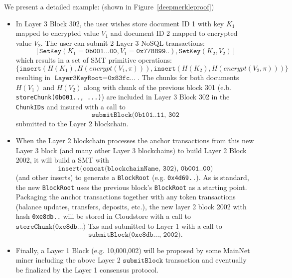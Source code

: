 \documentclass{article}
\newcommand{\databaseencryptionkey}{\pi}
\newcommand{\hash}[1]{H(#1)}
\newcommand{\encrypt}[1]{encrypt(#1, \databaseencryptionkey)}
\begin{document}
We present a detailed example: (shown in Figure~\ref{deepmerkleproof})
\begin{itemize}
\item In Layer 3 Block 302, the user wishes store document ID 1 with key $K_1$ mapped to encrypted value $V_1$ and document ID 2 mapped to encrypted value $V_2$. The user can submit 2 Layer 3 NoSQL transactions: 
\begin{equation*}
\left[ \texttt{SetKey}(K_1=\texttt{0b001...00},V_1=\texttt{0x778899..}), 
\texttt{SetKey}(K_2, V_2)
\right]
\end{equation*}
\noindent which results in a set of SMT primitive operations: 
\begin{equation*}
\{\texttt{insert}(\hash{K_1},\hash{\encrypt{V_1}}),  \texttt{insert}(\hash{K_2},\hash{\encrypt{V_2}}) \}
\end{equation*}
resulting in 
$\texttt{Layer3KeyRoot}=\texttt{0x83fc...}$.  The chunks for both documents $H(V_1)$ and $H(V_2)$ along with chunk of the previous block 301  (e.b. \texttt{storeChunk(0b001.., ...)}) are included in Layer 3 Block 302 in the \texttt{ChunkIDs} and insured with a call to \[
\texttt{submitBlock(0b101..11, 302}
\]
submitted to the Layer 2 blockchain. 

\item When the Layer 2 blockchain processes the anchor transactions from this new Layer 3 block (and many other Layer 3 blockchains) to build Layer 2 Block 2002, it will build a SMT with 
\[
\texttt{insert(concat(blockchainName, 302), 0b001..00)}
\]
(and other inserts) to generate a \texttt{BlockRoot} (e.g. \texttt{0x4d69..}).  As is standard, the new \texttt{BlockRoot} uses the previous block's \texttt{BlockRoot} as a starting point.  Packaging the anchor transactions together with any token transactions (balance updates, transfers, deposits, etc.), the new layer 2 block 2002 with hash \texttt{0xe8db..} will be stored in Cloudstore with a call to $\texttt{storeChunk(0xe8db...)}$ 
Txs and submitted to Layer 1 with a call to 
\[
\texttt{submitBlock(0xe8db..., 2002)}.  
\]
\item Finally, a Layer 1 Block (e.g. 10,000,002) will be proposed by some MainNet miner including the above Layer 2 $\texttt{submitBlock}$ transaction and eventually be finalized by the Layer 1 consensus protocol.
\end{itemize}
\end{document}

